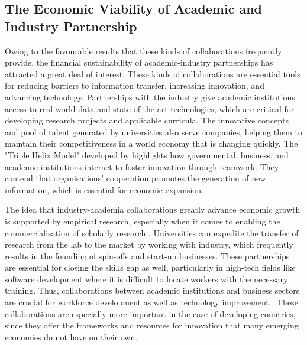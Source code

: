 \subsection{The Economic Viability of Academic and Industry Partnership}
\par{Owing to the favourable results that these kinds of collaborations frequently provide, the financial sustainability of academic-industry partnerships has attracted a great deal of interest. These kinds of collaborations are essential tools for reducing barriers to information transfer, increasing innovation, and advancing technology. Partnerships with the industry give academic institutions access to real-world data and state-of-the-art technologies, which are critical for developing research projects and applicable curricula. The innovative concepts and pool of talent generated by universities also serve companies, helping them to maintain their competitiveness in a world economy that is changing quickly. The "Triple Helix Model" developed by \cite{etzkowitz2000dynamics} highlights how governmental, business, and academic institutions interact to foster innovation through teamwork. They contend that organisations' cooperation promotes the generation of new information, which is essential for economic expansion.

The idea that industry-academia collaborations greatly advance economic growth is supported by empirical research, especially when it comes to enabling the commercialisation of scholarly research \citep{perkmann2013academic}. Universities can expedite the transfer of research from the lab to the market by working with industry, which frequently results in the founding of spin-offs and start-up businesses. These partnerships are essential for closing the skills gap as well, particularly in high-tech fields like software development where it is difficult to locate workers with the necessary training. Thus, collaborations between academic institutions and business sectors are crucial for workforce development as well as technology improvement \citep{ankrah2015universities}. These collaborations are especially more important in the case of developing countries, since they offer the frameworks and resources for innovation that many emerging economies do not have on their own.}
